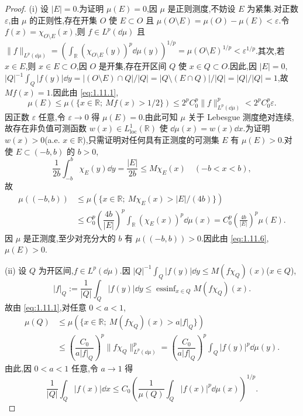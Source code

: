 \begin{proof}
(i) 设 $|E| = 0$.为证明 $\mu(E) = 0$,因 $\mu$ 是正则测度,不妨设 $E$ 为紧集.对正数 $\varepsilon$,由 $\mu$ 的正则性,存在开集 $O$ 使 $E \subset O$ 且 $\mu(O \setminus E) = \mu(O) - \mu(E) < \varepsilon$.令 $f(x) = \chi_{O\setminus E}(x)$,则 $f \in L^{p}(\dd\mu)$ 且 $\| f \|_{L^{p}(\dd\mu)} = \left(\int_{\mathbb{R}}\left(\chi_{O\setminus E}(y)\right)^{p}\dd\mu(y)\right)^{1/p} = \mu(O \setminus E)^{1/p} < \varepsilon^{1/p}$.其次,若 $x \in E$,则 $x \in E \subset O$,因 $O$ 是开集,存在开区间 $Q$ 使 $x \in Q \subset O$.因此,因 $|E| = 0$,$|Q|^{-1}\int_{Q}|f(y)|\dd y = |(O \setminus E) \cap Q|/|Q| = |Q \setminus (E \cap Q)|/|Q| = |Q|/|Q| = 1$,故 $Mf(x) = 1$.因此由 \eqref{eq:1.11.1},
\begin{equation*}
\mu(E) \leq \mu(\{x \in \mathbb{R};\ Mf(x) > 1/2\}) \leq 2^{p}C_{0}^{p}\| f \|_{L^{p}(\dd\mu)}^{p} < 2^{p}C_{0}^{p}\varepsilon.
\end{equation*}
因正数 $\varepsilon$ 任意,令 $\varepsilon \to 0$ 得 $\mu(E) = 0$.由此可知 $\mu$ 关于 Lebesgue 测度绝对连续,故存在非负值可测函数 $w(x) \in L_{\mathrm{loc}}^{1}(\mathbb{R})$ 使 $\dd\mu(x) = w(x)\dd x$.为证明 $w(x) > 0$(a.e. $x \in \mathbb{R}$),只需证明对任何具有正测度的可测集 $E$ 有 $\mu(E) > 0$.对使 $E \subset (-b, b)$ 的 $b > 0$,
\begin{equation*}
\frac{1}{2b}\int_{-b}^{b}\chi_{E}(y)\dd y = \frac{|E|}{2b} \leq M\chi_{E}(x) \quad (-b < x < b),
\end{equation*}
故
\begin{equation}\tag{1.11.6}\begin{aligned}
\mu((-b, b)) & \leq \mu(\{x \in \mathbb{R};\ M\chi_{E}(x) > |E|/(4b)\}) \\
& \leq C_{0}^{p}\left(\dfrac{4b}{|E|}\right)^{p}\displaystyle\int_{\mathbb{R}}\left(\chi_{E}(x)\right)^{p}\dd\mu(x) = C_{0}^{p}\left(\frac{4b}{|E|}\right)^{p}\mu(E).
\end{aligned}\label{eq:1.11.6}\end{equation}
因 $\mu$ 是正测度,至少对充分大的 $b$ 有 $\mu((-b, b)) > 0$.因此由 \eqref{eq:1.11.6},$\mu(E) > 0$.

(ii) 设 $Q$ 为开区间,$f \in L^{p}(\dd\mu)$.因 $|Q|^{-1}\int_{Q}|f(y)|\dd y \leq M(f\chi_{Q})(x)$($x \in Q$),
\begin{equation*}
|f|_{Q} := \frac{1}{|Q|}\int_{Q}|f(y)|\dd y \leq \operatorname{essinf}_{x \in Q}M(f\chi_{Q})(x).
\end{equation*}
故由 \eqref{eq:1.11.1},对任意 $0 < a < 1$,
\begin{align*}
\mu(Q) &\leq \mu(\{x \in \mathbb{R};\ M(f\chi_{Q})(x) > a|f|_{Q}\}) \\
\quad &\leq \left(\dfrac{C_{0}}{a|f|_{Q}}\right)^{p}\| f\chi_{Q} \|_{L^{p}(\dd\mu)}^{p} = \left(\dfrac{C_{0}}{a|f|_{Q}}\right)^{p}\displaystyle\int_{Q}|f(y)|^{p}\dd\mu(y).
\end{align*}
由此,因 $0 < a < 1$ 任意,令 $a \to 1$ 得
\begin{equation*}
\frac{1}{|Q|}\int_{Q}|f(x)|\dd x \leq C_{0}\left(\frac{1}{\mu(Q)}\int_{Q}|f(x)|^{p}\dd\mu(x)\right)^{1/p}.
\end{equation*}


\end{proof}
